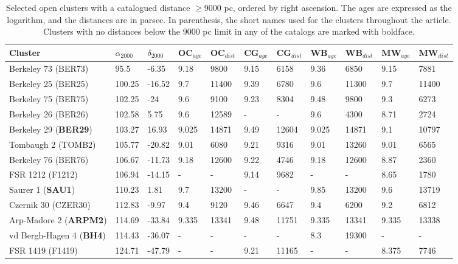 \documentclass[draft]{aa}
\begin{document}
 \begin{table}
 \caption{Selected open clusters with a catalogued distance $\geq$9000 pc,
 ordered by right ascension. The ages are expressed as the logarithm, and the
 distances are in parsec. In parenthesis, the short names used for the clusters
 throughout the article. Clusters with no distances below the 9000 pc limit in
 any of the catalogs are marked with boldface.}
 \label{tab:clusters}
 \centering
 \begin{tabular}{lllllllllll}
 \hline\hline
 Cluster & $\alpha_{2000}$  & $\delta_{2000}$ & OC$_{age}$ & OC$_{dist}$ & CG$_{age}$ &
 CG$_{dist}$ & WB$_{age}$ & WB$_{dist}$ & MW$_{age}$ & MW$_{dist}$ \\
 \hline
 Berkeley 73 (BER73)     & 95.5   & -6.35     & 9.18  & 9800  & 9.15  & 6158  &
 9.36 & 6850 & 9.15  & 7881  \\
 Berkeley 25 (BER25)     & 100.25 & -16.52    & 9.7   & 11400 & 9.39  & 6780  &
 9.6   & 11300 &  9.7   & 11400 \\
 Berkeley  75 (BER75)     & 102.25 & -24       & 9.6   & 9100  & 9.23  &  8304 
 & 9.48  & 9800  & 9.3   & 6273  \\
 Berkeley  26 (BER26)     & 102.58 & 5.75      & 9.6   & 12589 & -   & -   & 9.6
 & 4300  & 8.71  & 2724  \\
 Berkeley  29 (\textbf{BER29})     & 103.27 & 16.93     & 9.025 & 14871 & 9.49  & 12604 &
 9.025 & 14871 & 9.1   & 10797 \\
 Tombaugh 2 (TOMB2)     & 105.77 & -20.82    & 9.01  & 6080  & 9.21  & 9316  &
 9.01 & 13260 & 9.01  & 6565  \\
 Berkeley 76 (BER76)     & 106.67 & -11.73    & 9.18  & 12600 & 9.22  & 4746  &
 9.18 & 12600 & 8.87  & 2360  \\
 FSR 1212 (F1212)   & 106.94 & -14.15    & -   & -   & 9.14  & 9682  & -   & -
 & 8.65  & 1780  \\
 Saurer 1 (\textbf{SAU1})   & 110.23 & 1.81      & 9.7   & 13200 & -   & -   & 9.85  &
 13200 & 9.6   & 13719 \\
 Czernik 30 (CZER30)    & 112.83 & -9.97     & 9.4   & 9120  & 9.46  & 6647  &
 9.4 & 6200  & 9.2   & 6812  \\
 Arp-Madore 2 (\textbf{ARPM2})     & 114.69 & -33.84    & 9.335 & 13341 & 9.48  & 11751 &
 9.335 & 13341 & 9.335 & 13338 \\
 vd Bergh-Hagen 4 (\textbf{BH4})     & 114.43 & -36.07    & -   & -   & -   & -  
 & 8.3   & 19300 & -   & -   \\
 FSR 1419 (F1419)   & 124.71 & -47.79    & -   & -   & 9.21  & 11165 & -   & -   & 8.375 & 7746  \\

\end{tabular}
\end{table}
\end{document}
